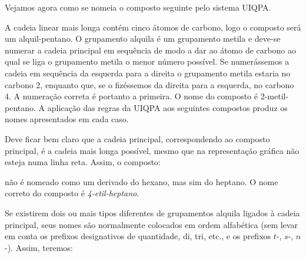 Vejamos agora como se nomeia o composto seguinte pelo sistema UIQPA.

\begin{tightcenter}
    \vspace{1em}
    \chemnameinit{}
\end{tightcenter}

\noindent A cadeia linear mais longa contém cinco átomos de carbono, logo o composto será um alquil-pentano. O grupamento alquila é um grupamento metila e deve-se numerar a cadeia principal em sequência de modo a dar ao átomo de carbono ao qual se liga o grupamento metila o menor número possível. Se numerássemos a cadeia em sequência da esquerda para a direita o grupamento metila estaria no carbono 2, enquanto que, se o fizéssemos da direita para a esquerda, no carbono 4. A numeração correta é portanto a primeira. O nome do composto é 2-metil-pentano. A aplicação das regras da UIQPA aos seguintes compostos produz os nomes apresentados em cada caso.

\begin{tightcenter}
    \qquad\qquad
    \qquad\qquad
    \chemnameinit{}
\end{tightcenter}

Deve ficar bem claro que a cadeia principal, correspondendo ao composto principal, é a cadeia mais longa possível, mesmo que na representação gráfica não esteja numa linha reta. Assim, o composto:

\begin{tightcenter}
    \chemnameinit{}
\end{tightcenter}

\noindent não é nomeado como um derivado do hexano, mas sim do heptano. O nome correto do composto é \textit{4-etil-heptano}. 

Se existirem dois ou mais tipos diferentes de grupamentos alquila ligados à cadeia principal, seus nomes são normalmente colocados em ordem alfabética (sem levar em conta os prefixos designativos de quantidade, di, tri, etc., e os prefixos $t$-, $s$-, $n$-). Assim, teremos:

